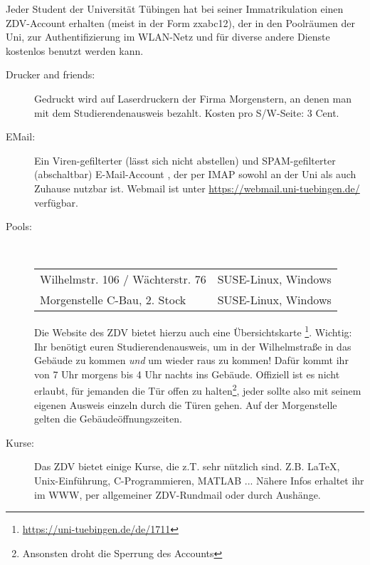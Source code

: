 Jeder Student der Universität Tübingen hat bei seiner Immatrikulation einen ZDV-Account erhalten (meist in der Form zxabc12), der in den Poolräumen der Uni, zur Authentifizierung im WLAN-Netz und für diverse andere Dienste kostenlos benutzt werden kann. 

\begin{description}

  \item[Drucker and friends:]
    Gedruckt wird auf Laserdruckern der Firma Morgenstern, an denen man mit dem Studierendenausweis bezahlt. Kosten pro S/W-Seite:
    3 Cent.

  \item[EMail:]
    Ein Viren-gefilterter (lässt sich nicht abstellen) und SPAM-gefilterter
    (abschaltbar) E-Mail-Account ,
    der per IMAP sowohl an der Uni als auch Zuhause nutzbar ist. Webmail ist unter \url{https://webmail.uni-tuebingen.de/} verfügbar. 

  \item[Pools:] ~\\
    \begin{tabular}{ll}
      Wilhelmstr. 106 / Wächterstr. 76 &                SUSE-Linux, Windows \\
      Morgenstelle C-Bau, 2. Stock &            SUSE-Linux, Windows \\
    \end{tabular}

    Die Website des ZDV bietet hierzu auch eine Übersichtskarte
    \footnote{\url{https://uni-tuebingen.de/de/1711}}.	%
    Wichtig: Ihr benötigt euren Studierendenausweis, um in der Wilhelmstraße in das Gebäude zu kommen \emph{und} um wieder raus zu kommen! Dafür kommt ihr von 7 Uhr morgens bis 4 Uhr nachts ins Gebäude. Offiziell ist es nicht erlaubt, für jemanden die Tür offen zu halten\footnote{Ansonsten droht die Sperrung des Accounts}, jeder sollte also mit seinem eigenen Ausweis einzeln durch die Türen gehen. Auf der Morgenstelle gelten die Gebäudeöffnungszeiten.

  \item[Kurse:]
    Das ZDV bietet einige Kurse, die z.T. sehr nützlich sind. Z.B. \LaTeX,
    Unix-Ein\-führ\-ung, C-Programmieren, MATLAB ... Nähere Infos erhaltet ihr im
    WWW, per allgemeiner ZDV-Rundmail oder durch Aushänge.


\end{description}
